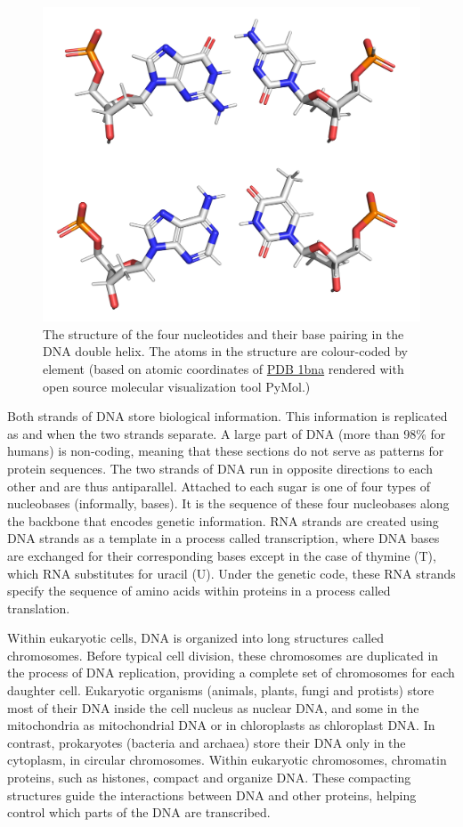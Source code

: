 \begin{figure}

{\centering \includegraphics[width=0.7\linewidth]{./figures/dna/bases_hydrogen} 

}

\caption{The structure of the four nucleotides and their base pairing in the DNA double helix. The atoms in the structure are colour-coded by element (based on atomic coordinates of \href{https://www.rcsb.org/structure/1bna}{PDB 1bna} rendered with open source molecular visualization tool PyMol.)}\label{fig:basestruc}
\end{figure}

Both strands of DNA store biological information. This information is replicated as and when the two strands separate. A large part of DNA (more than 98\% for humans) is non-coding, meaning that these sections do not serve as patterns for protein sequences. The two strands of DNA run in opposite directions to each other and are thus antiparallel. Attached to each sugar is one of four types of nucleobases (informally, bases). It is the sequence of these four nucleobases along the backbone that encodes genetic information. RNA strands are created using DNA strands as a template in a process called transcription, where DNA bases are exchanged for their corresponding bases except in the case of thymine (T), which RNA substitutes for uracil (U). Under the genetic code, these RNA strands specify the sequence of amino acids within proteins in a process called translation.

Within eukaryotic cells, DNA is organized into long structures called chromosomes. Before typical cell division, these chromosomes are duplicated in the process of DNA replication, providing a complete set of chromosomes for each daughter cell. Eukaryotic organisms (animals, plants, fungi and protists) store most of their DNA inside the cell nucleus as nuclear DNA, and some in the mitochondria as mitochondrial DNA or in chloroplasts as chloroplast DNA. In contrast, prokaryotes (bacteria and archaea) store their DNA only in the cytoplasm, in circular chromosomes. Within eukaryotic chromosomes, chromatin proteins, such as histones, compact and organize DNA. These compacting structures guide the interactions between DNA and other proteins, helping control which parts of the DNA are transcribed.

